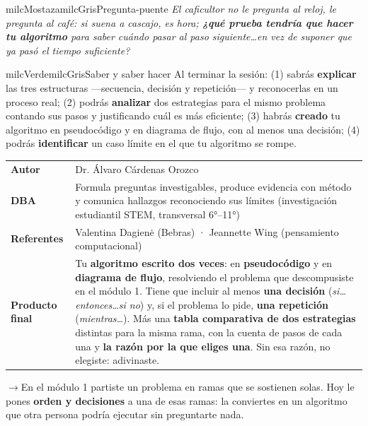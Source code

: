 \documentclass[11pt,letterpaper]{article}
\newcommand{\puente}[1]{%
  \begin{puentebox}%
    \textcolor{milcGradeDark}{$\rightarrow$}\hspace{2mm}#1%
  \end{puentebox}%
}
\begin{document}
\begin{softbox}{milcMostaza}{milcGris}{Pregunta-puente}
\textit{El caficultor no le pregunta al reloj, le pregunta al café: si suena a cascajo, es hora; \textbf{¿qué prueba tendría que hacer tu algoritmo} para saber cuándo pasar al paso siguiente\ldots en vez de suponer que ya pasó el tiempo suficiente?}
\end{softbox}

\begin{softbox}{milcVerde}{milcGris}{Saber y saber hacer}
Al terminar la sesión: (1) sabrás \textbf{explicar} las tres estructuras ---secuencia, decisión y repetición--- y reconocerlas en un proceso real; (2) podrás \textbf{analizar} dos estrategias para el mismo problema contando sus pasos y justificando cuál es más eficiente; (3) habrás \textbf{creado} tu algoritmo en pseudocódigo y en diagrama de flujo, con al menos una decisión; (4) podrás \textbf{identificar} un caso límite en el que tu algoritmo se rompe.
\end{softbox}



\small
\begin{tabularx}{\textwidth}{>{\bfseries}p{3.0cm}Y}
Autor & Dr. Álvaro Cárdenas Orozco\\
DBA & Formula preguntas investigables, produce evidencia con método y comunica hallazgos reconociendo sus límites (investigación estudiantil STEM, transversal 6°--11°)\\
Referentes & Valentina Dagienė (Bebras) · Jeannette Wing (pensamiento computacional)\\
Producto final & Tu \textbf{algoritmo escrito dos veces}: en \textbf{pseudocódigo} y en \textbf{diagrama de flujo}, resolviendo el problema que descompusiste en el módulo 1. Tiene que incluir al menos \textbf{una decisión} (\emph{si\ldots entonces\ldots si no}) y, si el problema lo pide, \textbf{una repetición} (\emph{mientras\ldots}). Más una \textbf{tabla comparativa de dos estrategias} distintas para la misma rama, con la cuenta de pasos de cada una y \textbf{la razón por la que eliges una}. Sin esa razón, no elegiste: adivinaste.\\
\end{tabularx}
\normalsize

\puente{En el módulo 1 partiste un problema en ramas que se sostienen solas. Hoy le pones \textbf{orden y decisiones} a una de esas ramas: la conviertes en un algoritmo que otra persona podría ejecutar sin preguntarte nada.}
\end{document}
